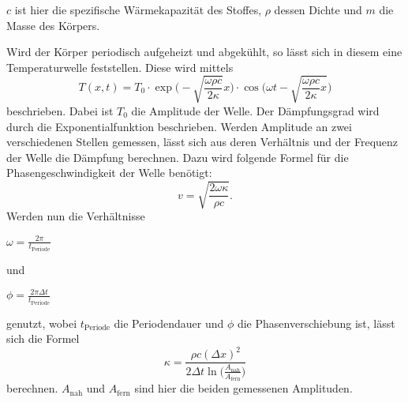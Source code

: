 $c$ ist hier die spezifische Wärmekapazität des Stoffes, $\rho$ dessen Dichte und $m$ die Masse des Körpers.

Wird der Körper periodisch aufgeheizt und abgekühlt, so lässt sich in diesem eine Temperaturwelle feststellen.
Diese wird mittels
\begin{equation}
\label{eqn:term-welle}
    T(x, t) = T_0 \cdot \exp \bigg( -\sqrt{\frac{\omega \rho c}{2 \kappa}} x \bigg) \cdot \cos\bigg( \omega t - \sqrt{\frac{\omega \rho c}{2 \kappa} x} \bigg)
\end{equation}
beschrieben. Dabei ist $T_0$ die Amplitude der Welle. Der Dämpfungsgrad wird durch die Exponentialfunktion beschrieben.
Werden Amplitude an zwei verschiedenen Stellen gemessen, lässt sich aus deren Verhältnis und der Frequenz der Welle die Dämpfung berechnen.
Dazu wird folgende Formel für die Phasengeschwindigkeit der Welle benötigt:
\begin{equation}
\label{eqn:phasengeschwindigkeit}
    v = \sqrt{\frac{2 \omega \kappa}{\rho c}}  .
\end{equation}
Werden nun die Verhältnisse 

\centerline{$\omega = \frac{2 \pi}{t_\text{Periode}}$}

und

\centerline{$\phi = \frac{2 \pi \Delta t}{t_\text{Periode}}$}

genutzt, wobei $t_\text{Periode}$ die Periodendauer und $\phi$ die Phasenverschiebung ist, lässt sich die Formel
\begin{equation}
\label{eqn:leitfaehigkeit}
    \kappa = \frac{\rho c (\Delta x)^2}{2 \Delta t \ln \Big(\frac{A_\text{nah}}{A_\text{fern}}\Big)}
\end{equation}
berechnen. $A_\text{nah}$ und $A_\text{fern}$ sind hier die beiden gemessenen Amplituden.